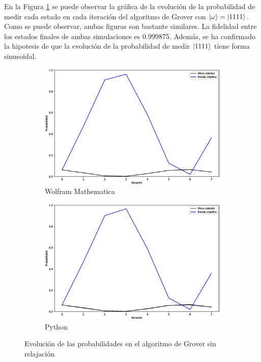 En la Figura \ref{fig:groverlosslesscomp1111} se puede observar la gráfica de la evolución de la probabilidad de medir cada estado en cada iteración del algoritmo de Grover con $\ket{\omega} = \ket{1111}$. Como se puede observar, ambas figuras son bastante similares. La fidelidad entre los estados finales de ambas simulaciones es 0.999875. Además, se ha confirmado la hipotesis de que la evolución de la probabilidad de medir $\ket{1111}$ tiene forma sinusoidal.

\begin{figure}[H]
    \centering
    \begin{subfigure}[m]{0.49\textwidth}
        \centering
        \includegraphics[width=0.9\linewidth]{img/groverallM.eps}
        \caption{Wolfram Mathematica}
    \end{subfigure}
    \begin{subfigure}[m]{0.49\textwidth}
        \centering
        \includegraphics[width=0.9\linewidth]{img/groveralllossless.eps}
        \caption{Python}
    \end{subfigure}
    \caption[Evolución de las probabilidades en el algoritmo de Grover sin relajación]{Evolución de las probabilidades en el algoritmo de Grover sin relajación}
    \label{fig:groverlosslesscomp1111}
\end{figure}

